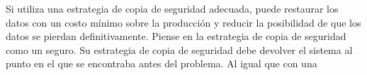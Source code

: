 \begin{enumerate}[3.1.]
Si utiliza una estrategia de copia de seguridad adecuada, puede restaurar los datos con un costo mínimo sobre la producción y reducir la posibilidad de que los datos se pierdan definitivamente. Piense en la estrategia de copia de seguridad como un seguro. Su estrategia de copia de seguridad debe devolver el sistema al punto en el que se encontraba antes del problema. Al igual que con una 


\end{enumerate} 
